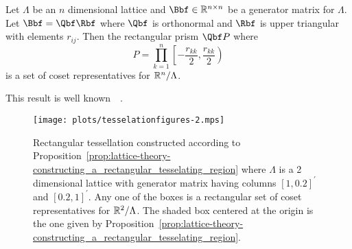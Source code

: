 \documentclass[journal]{IEEEtran}
\begin{document}
\begin{proposition}\label{prop:lattice-theory-constructing_a_rectangular_tesselating_region}
Let  $\Lambda$ be an $n$ dimensional lattice and $\Bbf \in \reals^{n\times n}$ be a generator matrix for $\Lambda$. Let $\Bbf = \Qbf\Rbf$ where $\Qbf$ is orthonormal and $\Rbf$ is upper triangular with elements $r_{ij}$.  Then the rectangular prism $\Qbf P$ where
\[
P = \prod_{k=1}^{n}{\left[-\frac{r_{kk}}{2}, \frac{r_{kk}}{2}\right)}
\]
is a set of coset representatives for ${\mathbb R}^n / \Lambda$.
\end{proposition}
\begin{IEEEproof}
This result is well known~\cite[Chapter IX, Theorem IV]{Cassels_geom_numbers_1997}~\cite[Proposition 2.1]{McKilliam2010thesis}.  %
\end{IEEEproof}

\begin{figure}[tp]
	\centering
		\texttt{[image: plots/tesselationfigures-2.mps]}
		\caption{Rectangular tessellation constructed according to Proposition~\ref{prop:lattice-theory-constructing_a_rectangular_tesselating_region} where $\Lambda$ is a 2 dimensional lattice with generator matrix having columns $[1, 0.2]^\prime$ and $[0.2, 1]^\prime$. Any one of the boxes is a rectangular set of coset representatives for ${\mathbb R}^2 / \Lambda$.  The shaded box centered at the origin is the one given by Proposition~\ref{prop:lattice-theory-constructing_a_rectangular_tesselating_region}.}
		\label{lattices:fig:tessellation2}
\end{figure} 
\end{document}
